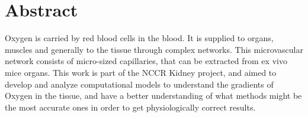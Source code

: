 \section*{Abstract}

Oxygen is carried by red blood cells in the blood. It is supplied to organs, muscles and generally to the tissue through complex networks. This microvascular network consists of micro-sized capillaries, that can be extracted from ex vivo mice organs. This work is part of the NCCR Kidney project, and aimed to develop and analyze computational models to understand the gradients of Oxygen in the tissue, and have a better understanding of what methods might be the most accurate ones in order to get physiologically correct results.